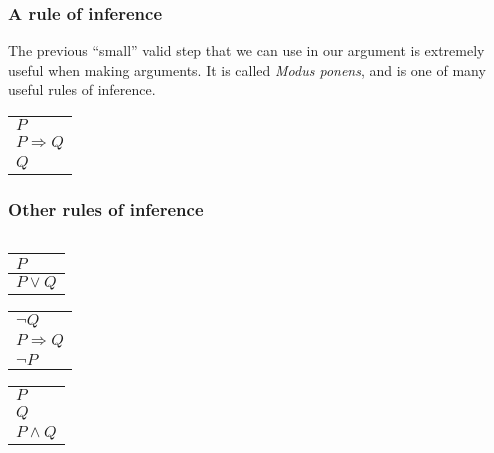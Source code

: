 \begin{frame}\frametitle{A rule of inference}
  The previous ``small'' valid step that we can use in our argument is
  extremely useful when making arguments.  It is called {\em Modus
    ponens}, and is one of many useful rules of inference.

  \begin{tcolorbox}[title=Modus ponens]
    \begin{tabular}{l}
      $P$\\
      $P\Rightarrow Q$\\
      \hline
      $Q$
    \end{tabular}
  \end{tcolorbox}
  
\end{frame}

\begin{frame}\frametitle{Other rules of inference}
  \begin{columns}
    
    \begin{column}{0.4\textwidth}

      \begin{tcolorbox}[title=Addition]
        \begin{tabular}{l}
          $P$\\
          \hline
          $P\vee Q$
        \end{tabular}
      \end{tcolorbox}
      
      \begin{tcolorbox}[title=Modus tollens]
        \begin{tabular}{l}
          $\neg Q$\\
          $P\Rightarrow Q$\\
          \hline
          $\neg P$
        \end{tabular}
      \end{tcolorbox}
      
      \begin{tcolorbox}[title=Conjuction]
        \begin{tabular}{l}
          $P$\\
          $Q$\\
          \hline
          $P\wedge Q$
        \end{tabular}
      \end{tcolorbox}
      
    \end{column}
    

\end{columns}
\end{frame}
